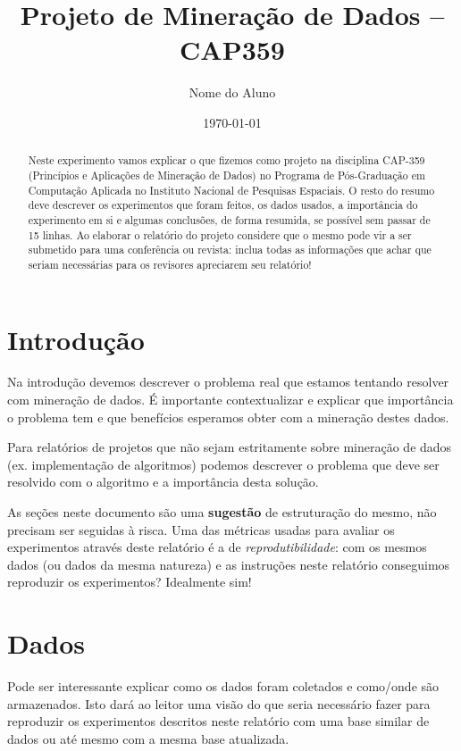\documentclass[12pt]{article}
\begin{document}
\title{Projeto de Mineração de Dados -- CAP359}
\author{Nome do Aluno}
\date{\today}
\maketitle

\begin{abstract}
Neste experimento vamos explicar o que fizemos como projeto na disciplina CAP-359 (Princípios e Aplicações de Mineração de Dados) no Programa de Pós-Graduação em Computação Aplicada no Instituto Nacional de Pesquisas Espaciais. O resto do resumo deve descrever os experimentos que foram feitos, os dados usados, a importância do experimento em si e algumas conclusões, de forma resumida, se possível sem passar de 15 linhas.  
Ao elaborar o relatório do projeto considere que o mesmo pode vir a ser submetido para uma conferência ou revista: inclua todas as informações que achar que seriam necessárias para os revisores apreciarem seu relatório!
\end{abstract}


\section{Introdução}
\label{sec:introducao}


Na introdução devemos descrever o problema real que estamos tentando resolver com mineração de dados. É importante contextualizar e explicar que importância o problema tem e que benefícios esperamos obter com a mineração destes dados.

Para relatórios de projetos que não sejam estritamente sobre mineração de dados (ex. implementação de algoritmos) podemos descrever o problema que deve ser resolvido com o algoritmo e a importância desta solução.

As seções neste documento são uma \textbf{sugestão} de estruturação do mesmo, não precisam ser seguidas à risca. Uma das métricas usadas para avaliar os experimentos através deste relatório é a de \textit{reprodutibilidade}: com os mesmos dados (ou dados da mesma natureza) e as instruções neste relatório conseguimos reproduzir os experimentos? Idealmente sim!

\section{Dados}
\label{sec:dados}


Pode ser interessante explicar como os dados foram coletados e como/onde são armazenados. Isto dará ao leitor uma visão do que seria necessário fazer para reproduzir os experimentos descritos neste relatório com uma base similar de dados ou até mesmo com a mesma base atualizada. 
\end{document}
